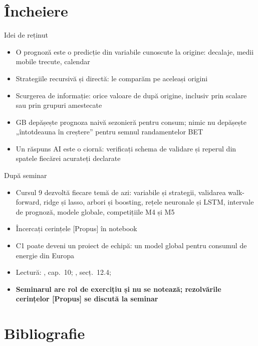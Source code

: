 \section{Încheiere}

\begin{frame}{Idei de reținut}
\itemsize{\small}
\begin{itemize}
    \item O prognoză este o predicție din variabile cunoscute la origine: decalaje, medii mobile trecute, calendar
    \item Strategiile recursivă și directă: le comparăm pe aceleași origini
    \item Scurgerea de informație: orice valoare de după origine, inclusiv prin scalare sau prin grupuri amestecate
    \item GB depășește prognoza naivă sezonieră pentru consum; nimic nu depășește „întotdeauna în creștere” pentru semnul randamentelor BET
    \item Un răspuns AI este o ciornă: verificați schema de validare și reperul din spatele fiecărei acurateți declarate
\end{itemize}
\end{frame}

\begin{frame}{După seminar}
\itemsize{\small}
\begin{itemize}
    \item Cursul 9 dezvoltă fiecare temă de azi: variabile și strategii, validarea walk-forward, ridge și lasso, arbori și boosting, rețele neuronale și LSTM, intervale de prognoză, modele globale, competițiile M4 și M5
    \item Încercați cerințele [Propus] în notebook
    \item C1 poate deveni un proiect de echipă: un model global pentru consumul de energie din Europa
    \item Lectură: , cap.~10; , secț.~12.4; 
    \item \textbf{Seminarul are rol de exercițiu și nu se notează; rezolvările cerințelor [Propus] se discută la seminar}
\end{itemize}
\end{frame}


\section{Bibliografie}

